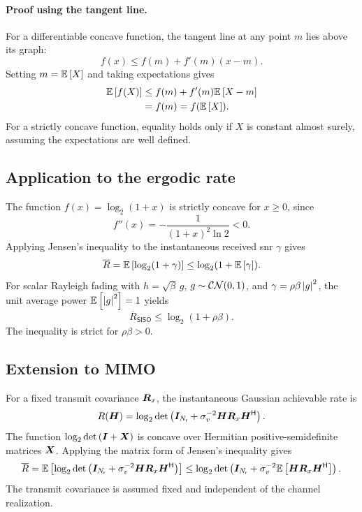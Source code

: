 \paragraph{Proof using the tangent line.}
For a differentiable concave function, the tangent line at any point $m$ lies above its graph:
\begin{equation*}
	f(x)\leq f(m)+f'(m)(x-m).
\end{equation*}
Setting $m=\mathbb{E}\left[X\right]$ and taking expectations gives
\begin{align*}
	\mathbb{E}\left[f(X)\right]
	&\leq f(m)+f'(m)\mathbb{E}\left[X-m\right]\\
	&=f(m)=f(\mathbb{E}\left[X\right]).
\end{align*}
For a strictly concave function, equality holds only if $X$ is constant almost surely, assuming the expectations are well defined.


\subsection{Application to the ergodic rate}
The function $f(x)=\log_2(1+x)$ is strictly concave for $x\geq0$, since
\begin{equation*}
	f''(x)=-\frac{1}{(1+x)^2\ln 2}<0.
\end{equation*}
Applying Jensen's inequality to the instantaneous received \ac{snr} $\gamma$ gives
\begin{equation}\label{eq:app-jensen-snr}
	\overline R
	=\mathbb{E}\left[\log_2(1+\gamma)\right]
	\leq\log_2(1+\mathbb{E}\left[\gamma\right]).
\end{equation}
For scalar Rayleigh fading with $h=\sqrt{\beta}\,g$, $g\sim\mathcal{CN}(0,1)$, and $\gamma=\rho\beta\left|g\right|^2$, the unit average power $\mathbb{E}\left[\left|g\right|^2\right]=1$ yields
\begin{equation}\label{eq:app-jensen-rayleigh}
	\boxed{
		\overline R_{\mathsf{SISO}}
		\leq\log_2(1+\rho\beta).
	}
\end{equation}
The inequality is strict for $\rho\beta>0$.


\subsection{Extension to MIMO}

For a fixed transmit covariance $\bm{R}_x$, the instantaneous Gaussian achievable rate is
\begin{equation*}
	R(\bm{H})
	=\log_2\operatorname{det}\left(
		\bm{I}_{N_{\mathsf{r}}}
		+\sigma_v^{-2}\bm{H}\bm{R}_x{\bm{H}}^{\mathsf{H}}
	\right).
\end{equation*}
The function
$\log_2\operatorname{det}\left(\bm{I}+\bm{X}\right)$
is concave over Hermitian positive-semidefinite matrices $\bm{X}$. 
Applying the matrix form of Jensen's inequality gives
\begin{equation}\label{eq:app-jensen-mimo}
	\overline R
	=\mathbb{E}\left[\log_2\operatorname{det}\left(
			\bm{I}_{N_{\mathsf{r}}}
			+\sigma_v^{-2}\bm{H}\bm{R}_x{\bm{H}}^{\mathsf{H}}
	\right)\right]
	\leq
	\log_2\operatorname{det}\left(
		\bm{I}_{N_{\mathsf{r}}}
		+\sigma_v^{-2}
		\mathbb{E}\left[\bm{H}\bm{R}_x{\bm{H}}^{\mathsf{H}}\right]
	\right).
\end{equation}
The transmit covariance is assumed fixed and
independent of the channel realization.


